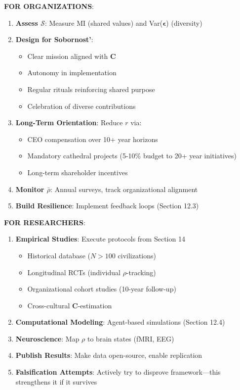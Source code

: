 \documentclass[11pt,a4paper]{article}
\theoremstyle{definition}
\theoremstyle{remark}
\begin{document}
\begin{enumerate}
\begin{protocol}
\begin{mdframed}[backgroundcolor=green!10,linewidth=2pt]
\textbf{FOR ORGANIZATIONS}:
\begin{enumerate}
    \item \textbf{Assess \(\mathcal{S}\)}: Measure MI (shared values) and Var(\(\boldsymbol{\epsilon}\)) (diversity)
    \item \textbf{Design for Sobornost'}:
        \begin{itemize}[nosep]
            \item Clear mission aligned with \(\mathbf{C}\)
            \item Autonomy in implementation
            \item Regular rituals reinforcing shared purpose
            \item Celebration of diverse contributions
        \end{itemize}
    \item \textbf{Long-Term Orientation}: Reduce \(r\) via:
        \begin{itemize}[nosep]
            \item CEO compensation over 10+ year horizons
            \item Mandatory cathedral projects (5-10\% budget to 20+ year initiatives)
            \item Long-term shareholder incentives
        \end{itemize}
    \item \textbf{Monitor \(\bar{\rho}\)}: Annual surveys, track organizational alignment
    \item \textbf{Build Resilience}: Implement feedback loops (Section 12.3)
\end{enumerate}

\textbf{FOR RESEARCHERS}:
\begin{enumerate}
    \item \textbf{Empirical Studies}: Execute protocols from Section 14
        \begin{itemize}[nosep]
            \item Historical database (\(N > 100\) civilizations)
            \item Longitudinal RCTs (individual \(\rho\)-tracking)
            \item Organizational cohort studies (10-year follow-up)
            \item Cross-cultural \(\mathbf{C}\)-estimation
        \end{itemize}
    \item \textbf{Computational Modeling}: Agent-based simulations (Section 12.4)
    \item \textbf{Neuroscience}: Map \(\rho\) to brain states (fMRI, EEG)
    \item \textbf{Publish Results}: Make data open-source, enable replication
    \item \textbf{Falsification Attempts}: Actively try to disprove framework—this strengthens it if it survives
\end{enumerate}


\end{mdframed}
\end{protocol}
\end{enumerate}
\end{document}
